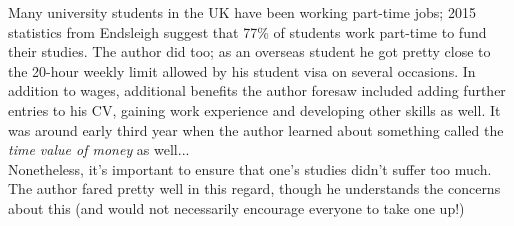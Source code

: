 \documentclass[12pt, a4paper]{article}
\begin{document}
\noindent Many university students in the UK have been working part-time jobs; 2015 statistics from Endsleigh \cite{endsleigh} suggest that 77\% of students work part-time to fund their studies. The author did too; as an overseas student he got pretty close to the 20-hour weekly limit allowed by his student visa on several occasions. In addition to wages, additional benefits the author foresaw included adding further entries to his CV, gaining work experience and developing other skills as well. It was around early third year when the author learned about something called the \textit{time value of money} as well... \\[12pt]
Nonetheless, it's important to ensure that one's studies didn't suffer too much. The author fared pretty well in this regard, though he understands the concerns about this (and would not necessarily encourage everyone to take one up!)
\end{document}
